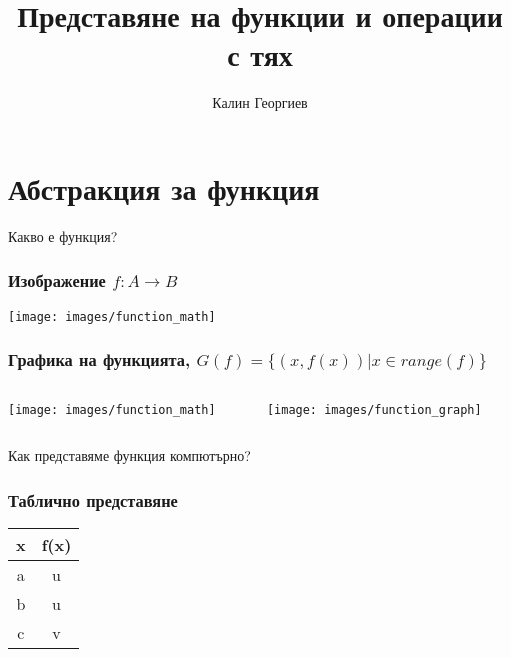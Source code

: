 \documentclass{beamer}
\begin{document}
\title[Обектно ориентирано програмиране]{Представяне на функции и операции с тях}
\author{Калин Георгиев}
\frame{\titlepage}

\section{Абстракция за функция}

\begin{frame}
\centerline{Какво е функция?}
\end{frame}




\begin{frame}[fragile]
\frametitle{Изображение $f:A\rightarrow B$}

\begin{center}
\texttt{[image: images/function\_math]}
\end{center}


\end{frame}



\begin{frame}[fragile]
\frametitle{Графика на функцията, $G(f)=\{(x,f(x))|x \in range(f)\}$}


\begin{columns}[t]
  \begin{column}{0.4\textwidth}
    \begin{center}
    \texttt{[image: images/function\_math]}
    \end{center}
  \end{column}
  \begin{column}{0.6\textwidth}
    \begin{center}
    \texttt{[image: images/function\_graph]}
    \end{center}

  \end{column}
\end{columns}


\end{frame}

\begin{frame}
\centerline{Как представяме функция компютърно?}
\end{frame}

\begin{frame}[fragile]
\frametitle{Таблично представяне}

\begin{center}
\begin{tabular}{c | c}
x & f(x) \\\hline
a & u \\
b & u \\
c & v
\end{tabular}

\end{center}


\end{frame}
\end{document}

